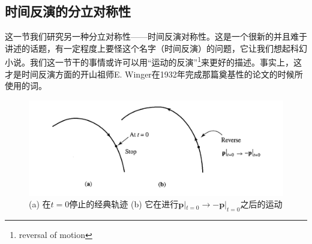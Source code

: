 \documentclass[UTF8,twoside]{ctexart}
\begin{document}
\subsection{时间反演的分立对称性}

这一节我们研究另一种分立对称性——时间反演对称性。这是一个很新的并且难于讲述的话题，有一定程度上要怪这个名字（时间反演）的问题，它让我们想起科幻小说。我们这一节干的事情或许可以用“运动的反演”\footnote{reversal of motion}来更好的描述。事实上，这才是时间反演方面的开山祖师E. Winger在1932年完成那篇奠基性的论文的时候所使用的词。

\begin{figure}[htbp]
\begin{centering}
\includegraphics[width = 12.4cm]{./Sakurai/Fig_4.10.png}
\caption{(a) 在$t=0$停止的经典轨迹 (b) 它在进行$\bm p|_{t=0}\rightarrow-\bm p|_{t=0}$之后的运动}
\label {Fig4.10}
\end{centering}
\end{figure}
\end{document}
